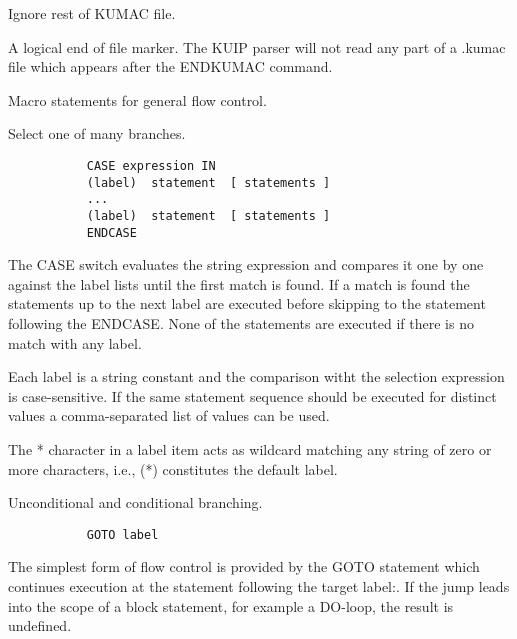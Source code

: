    \par
Ignore rest of KUMAC file.  

   \par
A logical \DQUOTE{}end of file\DQUOTE{} marker.  The KUIP parser will not 
   read any part of a .kumac file which appears after the 
   \DQUOTE{}ENDKUMAC\DQUOTE{} command.  

\ENDCMD
{}
\ifMENUtext
   \par
Macro statements for general flow control.  


\fi


   \par
Select one of many branches.  

\begin{verbatim}
           CASE expression IN
           (label)  statement  [ statements ]
           ...
           (label)  statement  [ statements ]
           ENDCASE
\end{verbatim}
\ENDVERB
   \par
The CASE switch evaluates the string expression and compares it one by one 
   against the label lists until the first match is found. If a match is found 
   the statements up to the next label are executed before skipping to the 
   statement following the ENDCASE. None of the statements are executed if 
   there is no match with any label.  

   \par
Each label is a string constant and the comparison witht the selection 
   expression is case-sensitive.  If the same statement sequence should be 
   executed for distinct values a comma-separated list of values can be used.  

   \par
The \DQUOTE{}*\DQUOTE{} character in a label item acts as wildcard matching 
   any string of zero or more characters, i.e., \DQUOTE{}(*)\DQUOTE{} 
   constitutes the default label.  

\ENDCMD


   \par
Unconditional and conditional branching.  

\begin{verbatim}
           GOTO label
\end{verbatim}
\ENDVERB
   \par
The simplest form of flow control is provided by the GOTO statement which 
   continues execution at the statement following the target 
   \DQUOTE{}label:\DQUOTE{}. If the jump leads into the scope of a block 
   statement, for example a DO-loop, the result is undefined.  

